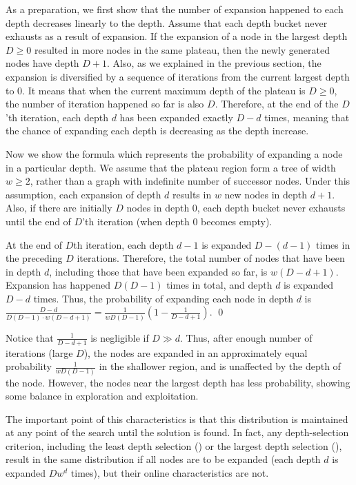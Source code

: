 As a preparation, we first show that the number of expansion happened to each depth decreases
linearly to the depth.
% 
Assume that each depth bucket never exhausts as a result of
expansion.  If the expansion of a node in the largest depth $D\geq 0$ resulted
in more nodes in the same plateau, then the newly generated nodes have
depth $D+1$.  Also, as we explained in the previous section, the
expansion is diversified by a sequence of iterations from the current
largest depth to 0.  It means that when the current maximum depth of
the plateau is $D\geq 0$, the number of iteration happened so far is also $D$.
Therefore, at the end of the $D$'th iteration, each depth $d$ has
been expanded exactly $D-d$ times, meaning that the chance of
expanding each depth is decreasing as the depth increase.

Now we show the formula which represents the probability of expanding a node in a particular depth.
We assume that the plateau region form a tree of width
$w\geq 2$, rather than a graph with indefinite number of successor
nodes.  Under this assumption, each expansion of depth $d$ results in
$w$ new nodes in depth $d+1$. Also, if there are initially
$D$ nodes in depth 0, each depth bucket never exhausts until the end of $D$'th
iteration (when depth 0 becomes empty).

At the end of $D$th iteration,
each depth $d-1$ is expanded $D-(d-1)$ times in the preceding $D$ iterations.
Therefore, the total number of nodes that have been in depth $d$, including those
that have been expanded so far, is $w(D-d+1)$.
Expansion has happened $D(D-1)$ times in total, and depth $d$ is expanded $D-d$ times.
Thus, the probability of expanding each node in depth $d$ is
$\frac{D-d}{D(D-1)\cdot w(D-d+1)}=\frac{1}{wD(D-1)}(1-\frac{1}{D-d+1})$.  \qed

Notice that $\frac{1}{D-d+1}$ is negligible if $D \gg d$.
Thus, after enough number of iterations (large $D$), the nodes are 
expanded in an approximately equal probability $\frac{1}{wD(D-1)}$ in the shallower region, and is
unaffected by the depth of the node.
However, the nodes near the largest depth has less probability, showing
some balance in exploration and exploitation.

The important point of this characteristics is that this
distribution is maintained at any point of the search until the solution
is found. In fact, any depth-selection criterion, including the least
depth selection (\fifo) or the largest depth selection (\lifo), 
result in the same distribution if all nodes are to be expanded (each
depth $d$ is expanded $Dw^d$ times), but their
online characteristics are not.
